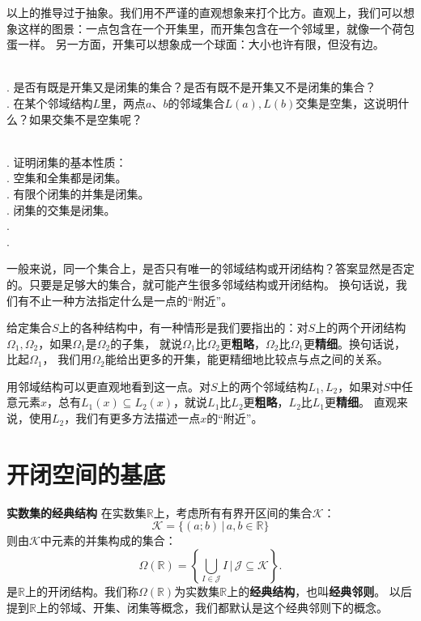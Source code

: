 \documentclass[12pt,UTF8]{ctexbook}
\begin{document}
\begin{appendix}
以上的推导过于抽象。我们用不严谨的直观想象来打个比方。直观上，我们可以想象这样的图景：一点包含在一个开集里，而开集包含在一个邻域里，就像一个荷包蛋一样。
另一方面，开集可以想象成一个球面：大小也许有限，但没有边。

\begin{sk}
    \mbox{} \\
    . 是否有既是开集又是闭集的集合？是否有既不是开集又不是闭集的集合？\\
    . 在某个邻域结构$L$里，两点$a$、$b$的邻域集合$L(a), L(b)$交集是空集，这说明什么？如果交集不是空集呢？
\end{sk}

\begin{xt}
    \mbox{} \\
    . 证明闭集的基本性质：\\
    . 空集和全集都是闭集。\\
    . 有限个闭集的并集是闭集。\\
    . 闭集的交集是闭集。\\
    . \\
    .
\end{xt}

一般来说，同一个集合上，是否只有唯一的邻域结构或开闭结构？答案显然是否定的。只要是足够大的集合，就可能产生很多邻域结构或开闭结构。
换句话说，我们有不止一种方法指定什么是一点的“附近”。

给定集合$S$上的各种结构中，有一种情形是我们要指出的：对$S$上的两个开闭结构$\Omega_1, \Omega_2$，如果$\Omega_1$是$\Omega_2$的子集，
就说$\Omega_1$比$\Omega_2$更\textbf{粗略}，$\Omega_2$比$\Omega_1$更\textbf{精细}。换句话说，比起$\Omega_1$，
我们用$\Omega_2$能给出更多的开集，能更精细地比较点与点之间的关系。

用邻域结构可以更直观地看到这一点。对$S$上的两个邻域结构$L_1, L_2$，如果对$S$中任意元素$x$，总有$L_1(x) \subseteq L_2(x)$，就说$L_1$比$L_2$更\textbf{粗略}，$L_2$比$L_1$更\textbf{精细}。
直观来说，使用$L_2$，我们有更多方法描述一点$x$的“附近”。

\section{开闭空间的基底}

\begin{tm}{\textbf{实数集的经典结构}}\label{tm:4-1-0}
    在实数集$\mathbb{R}$上，考虑所有有界开区间的集合$\mathcal{K}$：
    $$ \mathcal{K} = \{ (a;b) \, | \, a, b \in \mathbb{R} \}$$
    则由$\mathcal{K}$中元素的并集构成的集合：
    $$ \Omega(\mathbb{R}) = \left\{\bigcup_{I \in \mathcal{J}} I \, \Bigg| \,\mathcal{J} \subseteq  \mathcal{K} \right\}.$$
    是$\mathbb{R}$上的开闭结构。我们称$\Omega(\mathbb{R})$为实数集$\mathbb{R}$上的\textbf{经典结构}，也叫\textbf{经典邻则}。
    以后提到$\mathbb{R}$上的邻域、开集、闭集等概念，我们都默认是这个经典邻则下的概念。
\end{tm}


\end{appendix}
\end{document}
